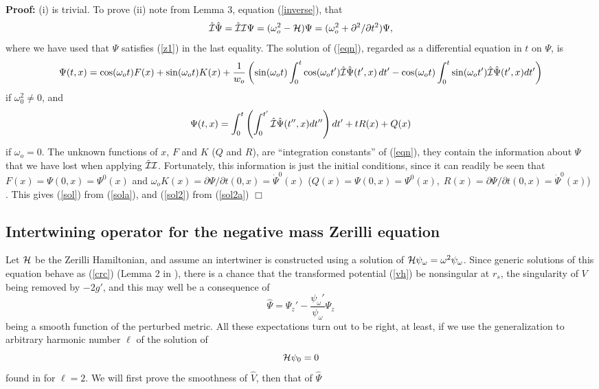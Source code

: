 \documentclass[aps,floats,showpacs,amssymb,tightenlines]{revtex4}
\def\w{\omega}
\def\p{\partial}
\def\I{{\cal I}}
\begin{document}
\noindent
{\bf Proof:} (i) is trivial. To prove (ii) note from Lemma 3, equation (\ref{inverse}),  that
\begin{equation} \label{eqn}
  \hat \I \hat \Psi = \hat \I \I \Psi =  (\w_o^2 - {\cal H}) \Psi = (\w_o^2 + \p^2  / \p t^2) \Psi ,
\end{equation}
where we have used that $\Psi$ satisfies  (\ref{z1}) in the last equality.
 The solution of (\ref{eqn}), regarded as a  differential equation in $t$  on $\Psi$, is
\begin{equation} \label{sola}
\Psi(t,x) =  \cos (\w_o t) F(x) + \sin (\w_o t) K(x) + \frac{1}{w_o} \left(
\sin (\w_o t) \int_0^t \cos (\w_o t')  \hat \I \hat \Psi (t',x) \, dt' -
\cos (\w_o t) \int_0^t \sin (\w_o t')  \hat \I \hat \Psi(t',x) dt' \right)
\end{equation}
if $\w_0^2 \neq 0$, and
\begin{equation}  \label{sol2a}
\Psi(t,x) = \int_0^t \left( \int_0^{t'}  \hat \I \hat \Psi(t'',x) dt'' \right) dt' + t R(x) + Q(x)
\end{equation}
if $\w_o =0$. The unknown functions of $x$, $F$ and $K$ ($Q$ and $R$), are ``integration constants'' of (\ref{eqn}),
 they contain  the information about $\Psi$ that we have lost
when applying $\hat \I \I$. Fortunately, this information  is just the
initial conditions, since it can readily be seen that $F(x) = \Psi(0,x)= \Psi^0(x) $ and $\w_o K(x)=\p \Psi / \p t (0,x) =
\dot \Psi^0 (x)$ ($Q(x) = \Psi(0,x)= \Psi^0(x), \;R(x)=\p \Psi / \p t (0,x) =
\dot \Psi^0 (x)$) .
This gives (\ref{sol}) from (\ref{sola}), and (\ref{sol2}) from (\ref{sol2a}) $\Box$\\


\subsection{Intertwining operator for the negative mass Zerilli equation} \label{apli}

Let ${\cal H}$ be the Zerilli Hamiltonian, and assume an intertwiner is constructed using a solution of
 ${\cal H} \psi_{\w} = \w^2 \psi_{\w}$. Since generic
solutions of this equation behave as (\ref{crc}) (Lemma 2 in \cite{dg}), there is a chance
that the transformed potential (\ref{vh}) be nonsingular at $r_s$, the singularity of $V$ being removed by $-2g'$,
and this may well be a consequence of
\begin{equation}\label{hpsi1}
\hat \Psi = \Psi_z' - \frac{\psi_{\w}{}'}{\psi_{\w}} \Psi_z
\end{equation}
being a smooth function of the perturbed metric. All these expectations
turn out to be right, at least, if we  use the generalization to
arbitrary harmonic number $\ell$ of the solution of
\begin{equation}\label{zm1}
{\cal H} \psi_0 = 0
\end{equation}
found in \cite{ghi} for $\ell=2$. We will first prove the smoothness of $\hat V$, then that of $\hat \Psi$\\
\end{document}
